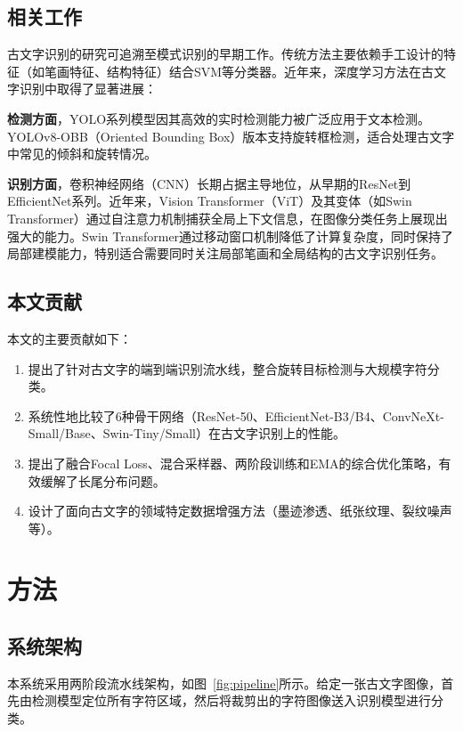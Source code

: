\documentclass[12pt,a4paper]{article}
\begin{document}
\subsection{相关工作}

古文字识别的研究可追溯至模式识别的早期工作。传统方法主要依赖手工设计的特征（如笔画特征、结构特征）结合SVM等分类器。近年来，深度学习方法在古文字识别中取得了显著进展：

\textbf{检测方面}，YOLO系列模型因其高效的实时检测能力被广泛应用于文本检测。YOLOv8-OBB（Oriented Bounding Box）版本支持旋转框检测，适合处理古文字中常见的倾斜和旋转情况。

\textbf{识别方面}，卷积神经网络（CNN）长期占据主导地位，从早期的ResNet到EfficientNet系列。近年来，Vision Transformer（ViT）及其变体（如Swin Transformer）通过自注意力机制捕获全局上下文信息，在图像分类任务上展现出强大的能力。Swin Transformer通过移动窗口机制降低了计算复杂度，同时保持了局部建模能力，特别适合需要同时关注局部笔画和全局结构的古文字识别任务。

\subsection{本文贡献}

本文的主要贡献如下：
\begin{enumerate}
    \item 提出了针对古文字的端到端识别流水线，整合旋转目标检测与大规模字符分类。
    \item 系统性地比较了6种骨干网络（ResNet-50、EfficientNet-B3/B4、ConvNeXt-Small/Base、Swin-Tiny/Small）在古文字识别上的性能。
    \item 提出了融合Focal Loss、混合采样器、两阶段训练和EMA的综合优化策略，有效缓解了长尾分布问题。
    \item 设计了面向古文字的领域特定数据增强方法（墨迹渗透、纸张纹理、裂纹噪声等）。
\end{enumerate}

\section{方法}

\subsection{系统架构}

本系统采用两阶段流水线架构，如图~\ref{fig:pipeline}所示。给定一张古文字图像，首先由检测模型定位所有字符区域，然后将裁剪出的字符图像送入识别模型进行分类。
\end{document}
